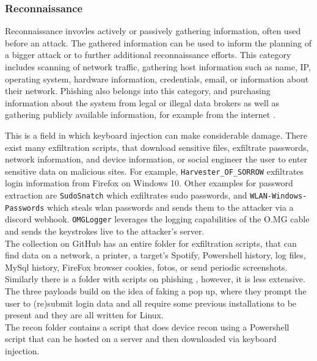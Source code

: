 \subsubsection{Reconnaissance}

Reconnaissance invovles actively or passively gathering information, often used before an attack. The gathered information can be used to inform the planning of a bigger attack or to further additional reconnaissance efforts. This category includes scanning of network traffic, gathering host information such as name, IP, operating system, hardware information, credentials, email, or information about their network. Phishing also belongs into this category, and purchasing information about the system from legal or illegal data brokers as well as gathering publicly available information, for example from the internet \cite{MITREATTCK}.

This is a field in which keyboard injection can make considerable damage. There exist many exfiltration scripts, that download sensitive files, exfiltrate passwords, network information, and device information, or social engineer the user to enter sensitive data on malicious sites. 
For example, \verb|Harvester_OF_SORROW| \cite{OmgpayloadsPayloadsLibrary} exfiltrates login information from Firefox on Windows 10. Other examples for password extraction are \verb|SudoSnatch| \cite{OmgpayloadsPayloadsLibrary} which exfiltrates sudo passwords, and \verb|WLAN-Windows-Passwords| \cite{OmgpayloadsPayloadsLibrary}which steals wlan passwords and sends them to the attacker via a discord webhook. 
\verb|OMGLogger| \cite{OmgpayloadsPayloadsLibrary} leverages the logging capabilities of the O.MG cable and sends the keystrokes live to the attacker's server. \\
The collection on GitHub has an entire folder for exfiltration scripts, that can find data on a network, a printer, a target's Spotify, Powershell history, log files, MySql history, FireFox browser cookies, fotos, or send periodic screenshots. \\
Similarly there is a folder with scripts on phishing  \cite{OmgpayloadsPayloadsLibrary}, however, it is less extensive. The three payloads build on the idea of faking a pop up, where they prompt the user to (re)submit login data and all require some previous installations to be present and they are all written for Linux. \\
The recon folder contains a script that does device recon using a Powershell script that can be hosted on a server and then downloaded via keyboard injection. 


